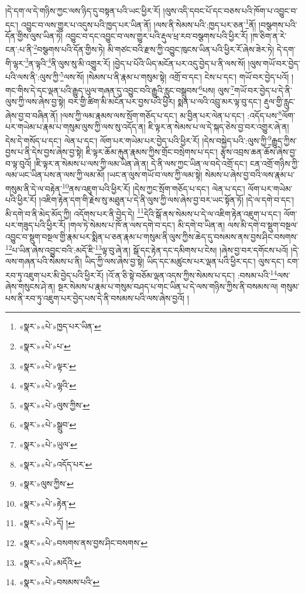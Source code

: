།དེ་དག་ལ་དེ་གཉིས་ཀྱང་ལས་ཉིད་དུ་བསྟན་པའི་ཡང་ཕྱིར་རོ། །ལུས་འདི་དབང་པོ་དང་བཅས་པའི་ཁོག་པ་འབྱུང་བ་དང་། འབྱུང་བ་ལས་གྱུར་པ་འདུས་པའི་ཁྱད་པར་ཡིན་ནོ། །ལས་ནི་སེམས་པའི་:ཁྱད་པར་ཅན་\footnote{«སྣར་»«པེ་»ཁྱད་པར་ཡིན་}ནོ། །བསྩགས་པའི་དོན་གྱིས་ལུས་ཡིན་ཏེ། འབྱུང་བ་དང་འབྱུང་བ་ལས་གྱུར་པའི་རྡུལ་ཕྲ་རབ་བསྩགས་པའི་ཕྱིར་རོ། །ཁ་ཅིག་ན་རེ་ངན་:པ་ནི་\footnote{«སྣར་»«པེ་»པ་}བསྩགས་པའི་དོན་གྱིས་ཏེ། མི་གཙང་བའི་རྫས་ཀྱི་འབྱུང་ཁུངས་ཡིན་པའི་ཕྱིར་རོ་ཞེས་ཟེར་ཏེ། དེ་དག་གི་ལྷར་\footnote{«སྣར་»«པེ་»ལྟར་}ན་ལྟའི་\footnote{«སྣར་»«པེ་»ལྷའི་}ནི་ལུས་སུ་མི་འགྱུར་རོ། །བྱེད་པ་པོའི་ཡིད་མངོན་པར་འདུ་བྱེད་པ་ནི་ལས་སོ། །ལུས་གཡོ་བར་བྱེད་པའི་ལས་ནི་:ལུས་ཀྱི་\footnote{«སྣར་»«པེ་»ལུས་ཀྱིས་}ལས་སོ། །སེམས་པ་ནི་རྣམ་པ་གསུམ་སྟེ། འགྲོ་བ་དང་། ངེས་པ་དང་། གཡོ་བར་བྱེད་པའོ། །གང་གིས་དེ་དང་ལྡན་པའི་རྒྱུད་ཡུལ་གཞན་དུ་འབྱུང་བའི་རྒྱུའི་རླུང་བསྒྲུབས་\footnote{«སྣར་»«པེ་»སྒྲུབ་}པས། ལུས་\footnote{«སྣར་»«པེ་»ཡུལ་}གཡོ་བར་བྱེད་པ་དེ་ནི་ལུས་ཀྱི་ལས་ཞེས་བྱ་སྟེ། བར་གྱི་ཚིག་མི་མངོན་པར་བྱས་པའི་ཕྱིར། སྨན་པ་ལའི་འབྲུ་མར་ལྟ་བུ་དང་། རྡུལ་གྱི་རླུང་ཞེས་བྱ་བ་བཞིན་ནོ། །ལས་ཀྱི་ལམ་རྣམས་ལས་སྲོག་གཅོད་པ་དང་། མ་བྱིན་པར་ལེན་པ་དང་། :འདོད་པས་\footnote{«སྣར་»«པེ་»འདོད་པར་}ལོག་པར་གཡེམ་པ་རྣམ་པ་གསུམ་ལུས་ཀྱི་ལས་སུ་འདོད་ན། ཇི་ལྟར་ན་སེམས་པ་ལ་དེ་སྐད་ཅེས་བྱ་བར་འགྱུར་ཞེ་ན། དེས་དེ་གསོད་པ་དང་། ལེན་པ་དང་། ལོག་པར་གཡེམ་པར་བྱེད་པའི་ཕྱིར་རོ། །དེས་བསྐྱེད་པའི་:ལུས་ཀྱི་\footnote{«སྣར་»ལུས་ཀྱིས་}རྒྱུད་ཀྱིས་བྱས་པ་ནི་དེས་བྱས་ཞེས་བྱ་སྟེ། ཇི་ལྟར་ཆོམ་རྐུན་རྣམས་ཀྱིས་གྲོང་བསྲེགས་པ་དང་། རྩྭས་འབྲས་ཆན་ཆོས་ཞེས་བྱ་བ་ལྟ་བུའོ། །ཇི་ལྟར་ན་སེམས་པ་ལས་ཀྱི་ལམ་ཡིན་ཞེ་ན། དེ་ནི་ལས་ཀྱང་ཡིན་ལ་བདེ་འགྲོ་དང་། ངན་འགྲོ་གཉིས་ཀྱི་ལམ་ཡང་ཡིན་པས་ན་ལས་ཀྱི་ལམ་མོ། །ཡང་ན་ལུས་གཡོ་བ་ལས་ཀྱི་ལམ་སྟེ། སེམས་པ་ཞེས་བྱ་བའི་ལས་རྣམ་པ་གསུམ་ནི་དེ་ལ་བརྟེན་\footnote{«སྣར་»«པེ་»རྟེན་}ནས་འཇུག་པའི་ཕྱིར་རོ། །དེས་ཀྱང་སྲོག་གཅོད་པ་དང་། ལེན་པ་དང་། ལོག་པར་གཡེམ་པའི་ཕྱིར་རོ། །འཇིག་རྟེན་དག་གི་རྗེས་སུ་མཐུན་པ་དེ་ནི་ལུས་ཀྱི་ལས་ཞེས་བྱ་བར་ཡང་སྟོན་ཏོ། །དེ་ལ་དགེ་བ་དང་། མི་དགེ་བ་ནི་མེད་མོད་ཀྱི། འདོགས་པར་ནི་བྱེད་དེ། \footnote{«སྣར་»«པེ་»དོ། ། }དེའི་སྒོ་ནས་སེམས་པ་དེ་ལ་འཇིག་རྟེན་འཇུག་པ་དང་། ལོག་པར་གཟུད་པའི་ཕྱིར་རོ། །གལ་ཏེ་སེམས་པ་ཁོ་ན་ལས་དགེ་བ་དང་། མི་དགེ་བ་ཡིན་ན། ལས་མི་དགེ་བ་སྡུག་བསྔལ་འབྱུང་བ་སྡུག་བསྔལ་གྱི་རྣམ་པར་སྨིན་པ་ཅན་རྣམ་པ་གསུམ་ནི་ལུས་ཀྱིས་ཆེད་དུ་བསམས་ནས་བྱས་ཤིང་བསགས་\footnote{«སྣར་»«པེ་»བསགས་ནས་བྱས་ཤིང་བསགས་}པ་ཡིན་ཞེས་འབྱུང་བའི་:མདོ་ཇི་\footnote{«སྣར་»«པེ་»མདོའི་}ལྟ་བུ་ཞེ་ན། སྒོ་དང་རྟེན་དང་དམིགས་པ་ངེས། །ཞེས་བྱ་བར་དགོངས་པའོ། །དེ་ལས་གཞན་པའི་སེམས་པ་ནི། ཡིད་ཀྱི་ལས་ཞེས་བྱ་སྟེ། ཡིད་དང་མཚུངས་པར་ལྡན་པའི་ཕྱིར་དང་། ལུས་དང་། ངག་རབ་ཏུ་འཇུག་པར་མི་བྱེད་པའི་ཕྱིར་རོ། །འོ་ན་ཅི་སྟེ་བཅོམ་ལྡན་འདས་ཀྱིས་སེམས་པ་དང་། :བསམ་པའི་\footnote{«སྣར་»«པེ་»བསམས་པའི་}ལས་ཞེས་གསུངས་ཤེ་ན། སྔར་སེམས་པ་རྣམ་པ་གསུམ་བཤད་པ་གང་ཡིན་པ་དེ་ལས་གཉིས་ཀྱིས་ནི་བསམས་ལ། གསུམ་པས་ནི་རབ་ཏུ་འཇུག་པར་བྱེད་པས་དེ་ནི་བསམས་པའི་ལས་ཞེས་བྱའོ། །
